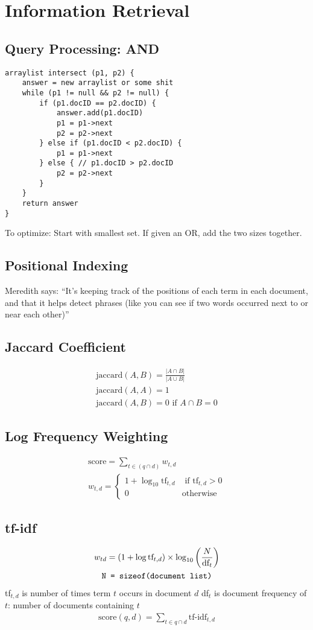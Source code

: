 \documentclass[10pt,twocolumn]{amsart}
\begin{document}
\section{Information Retrieval}
\subsection{Query Processing: AND}
\begin{verbatim}
arraylist intersect (p1, p2) {
    answer = new arraylist or some shit
    while (p1 != null && p2 != null) {
        if (p1.docID == p2.docID) {
            answer.add(p1.docID)
            p1 = p1->next
            p2 = p2->next
        } else if (p1.docID < p2.docID) {
            p1 = p1->next
        } else { // p1.docID > p2.docID
            p2 = p2->next
        }
    }
    return answer
}
\end{verbatim}
To optimize: Start with smallest set. If given an OR, add the two sizes together.
\subsection{Positional Indexing}
Meredith says: ``It's keeping track of the positions of each term in each document,
and that it helps detect phrases (like you can see if two words occurred next 
to or near each other)''
\subsection{Jaccard Coefficient}
\begin{gather*}
\text{jaccard}(A, B) = \frac{|A \cap B|}{|A \cup B|} \\
\text{jaccard}(A, A) = 1 \\
\text{jaccard}(A, B) = 0 \text{ if } A \cap B = 0
\end{gather*}
\subsection{Log Frequency Weighting}
\begin{gather*}
\text{score} = \sum_{t \in (q \cap d)} w_{t,d}\\
w_{t,d} = \begin{cases}
           1 + \log_{10} \text{tf}_{t,d} & \text{ if tf}_{t,d} > 0 \\
           0 & \text{otherwise}
          \end{cases}
\end{gather*}
\subsection{tf-idf}
\begin{gather*}
w_{td} = \left(1 + \log \text{tf}_{t,d}\right) \times 
         \log_{10}\left(\frac{N}{\text{df}_{t}}\right) \\
\text{\texttt{N = sizeof(document list)}}
\end{gather*}
tf$_{t,d}$ is number of times term $t$ occurs in document $d$
df$_{t}$ is document frequency of $t$: number of documents containing $t$
\begin{gather*}
\text{score}(q,d) = \sum_{t \in q \cap d} \text{tf-idf}_{t,d}
\end{gather*}
\end{document}
